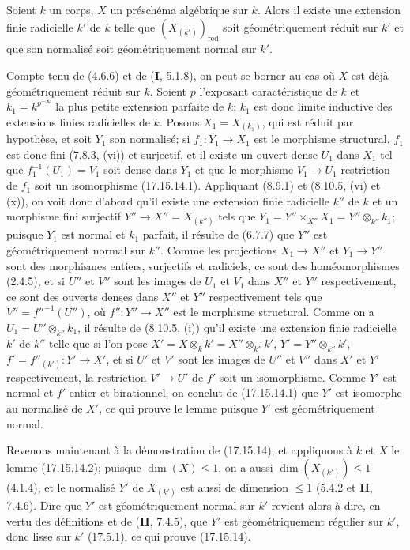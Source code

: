 \begin{lemma}[17.15.14.2]
\label{IV.17.15.14.2}
Soient $k$ un corps, $X$ un préschéma algébrique sur $k$. Alors il existe une extension finie radicielle $k'$ de $k$ telle que $(X_{(k')})_{\mathrm{red}}$ soit géométriquement réduit sur $k'$ et que son normalisé soit géométriquement normal sur $k'$.
\end{lemma}

Compte tenu de (4.6.6) et de (\textbf{I}, 5.1.8), on peut se borner au cas où $X$ est déjà géométriquement réduit sur $k$. Soient $p$ l'exposant caractéristique de $k$ et $k_1=k^{p^{-\infty}}$ la plus petite extension parfaite de $k$; $k_1$ est donc limite inductive des extensions finies radicielles de $k$. Posons $X_1=X_{(k_1)}$, qui est réduit par hypothèse, et soit $Y_1$ son normalisé; si $f_1:Y_1\to X_1$ est le morphisme structural, $f_1$ est donc fini (7.8.3, (vi)) et surjectif, et il existe un ouvert dense $U_1$ dans $X_1$ tel que $f_1^{-1}(U_1)=V_1$ soit dense dans $Y_1$ et que le morphisme $V_1\to U_1$ restriction de $f_1$ soit un isomorphisme (17.15.14.1). Appliquant (8.9.1) et (8.10.5, (vi) et (x)), on voit donc d'abord qu'il existe une extension finie radicielle $k''$ de $k$ et un morphisme fini surjectif $Y''\to X''=X_{(k'')}$ tels que $Y_1=Y''\times_{X''}X_1=Y''\otimes_{k''}k_1$; puisque $Y_1$ est normal et $k_1$ parfait, il résulte de (6.7.7) que $Y''$ est géométriquement normal sur $k''$. Comme les projections $X_1\to X''$ et $Y_1\to Y''$ sont des morphismes entiers, surjectifs et radiciels, ce sont des homéomorphismes (2.4.5), et si $U''$ et $V''$ sont les images de $U_1$ et $V_1$ dans $X''$ et $Y''$ respectivement, ce sont des ouverts denses dans $X''$ et $Y''$ respectivement tels que $V''=f''^{-1}(U'')$, où $f'':Y''\to X''$ est le morphisme structural. Comme on a $U_1=U''\otimes_{k''}k_1$, il résulte de (8.10.5, (i)) qu'il existe une extension finie radicielle $k'$ de $k''$ telle que si l'on pose $X'=X\otimes_k k'=X''\otimes_{k''}k'$, $Y'=Y''\otimes_{k''}k'$, $f'=f''_{(k')}:Y'\to X'$, et si $U'$ et $V'$ sont les images de $U''$ et $V''$ dans $X'$ et $Y'$ respectivement, la restriction $V'\to U'$ de $f'$ soit un isomorphisme. Comme $Y'$ est normal et $f'$ entier et birationnel, on conclut de (17.15.14.1) que $Y'$ est isomorphe au normalisé de $X'$, ce qui prouve le lemme puisque $Y'$ est géométriquement normal.

Revenons maintenant à la démonstration de (17.15.14), et appliquons à $k$ et $X$ le lemme (17.15.14.2); puisque $\dim(X)\leq1$, on a aussi $\dim(X_{(k')})\leq1$ (4.1.4), et le normalisé $Y'$ de $X_{(k')}$ est aussi de dimension $\leq1$ (5.4.2 et \textbf{II}, 7.4.6). Dire que $Y'$ est géométriquement normal sur $k'$ revient alors à dire, en vertu des définitions et de (\textbf{II}, 7.4.5), que $Y'$ est géométriquement régulier sur $k'$, donc lisse sur $k'$ (17.5.1), ce qui prouve (17.15.14).

